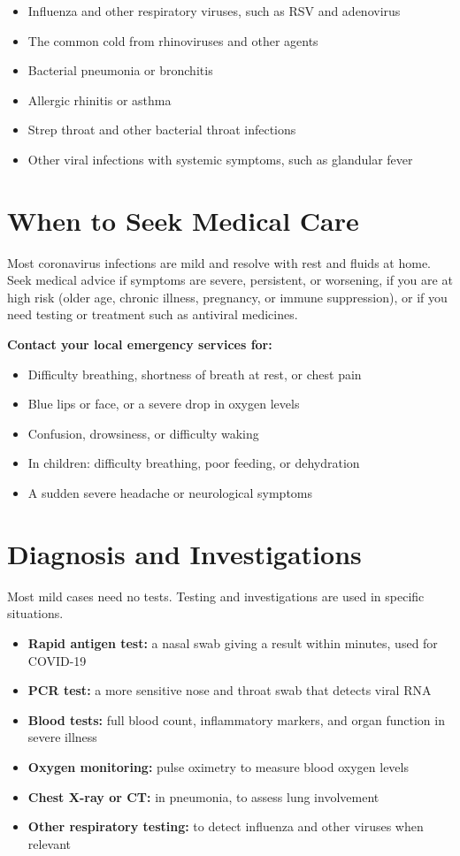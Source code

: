 \begin{itemize}
    \item Influenza and other respiratory viruses, such as RSV and adenovirus
    \item The common cold from rhinoviruses and other agents
    \item Bacterial pneumonia or bronchitis
    \item Allergic rhinitis or asthma
    \item Strep throat and other bacterial throat infections
    \item Other viral infections with systemic symptoms, such as glandular fever
\end{itemize}

\section*{When to Seek Medical Care}
Most coronavirus infections are mild and resolve with rest and fluids at home. Seek medical advice if symptoms are severe, persistent, or worsening, if you are at high risk (older age, chronic illness, pregnancy, or immune suppression), or if you need testing or treatment such as antiviral medicines.

\textbf{Contact your local emergency services for:}
\begin{itemize}
    \item Difficulty breathing, shortness of breath at rest, or chest pain
    \item Blue lips or face, or a severe drop in oxygen levels
    \item Confusion, drowsiness, or difficulty waking
    \item In children: difficulty breathing, poor feeding, or dehydration
    \item A sudden severe headache or neurological symptoms
\end{itemize}

\section*{Diagnosis and Investigations}
Most mild cases need no tests. Testing and investigations are used in specific situations.

\begin{itemize}
    \item \textbf{Rapid antigen test:} a nasal swab giving a result within minutes, used for COVID-19
    \item \textbf{PCR test:} a more sensitive nose and throat swab that detects viral RNA
    \item \textbf{Blood tests:} full blood count, inflammatory markers, and organ function in severe illness
    \item \textbf{Oxygen monitoring:} pulse oximetry to measure blood oxygen levels
    \item \textbf{Chest X-ray or CT:} in pneumonia, to assess lung involvement
    \item \textbf{Other respiratory testing:} to detect influenza and other viruses when relevant
\end{itemize}

